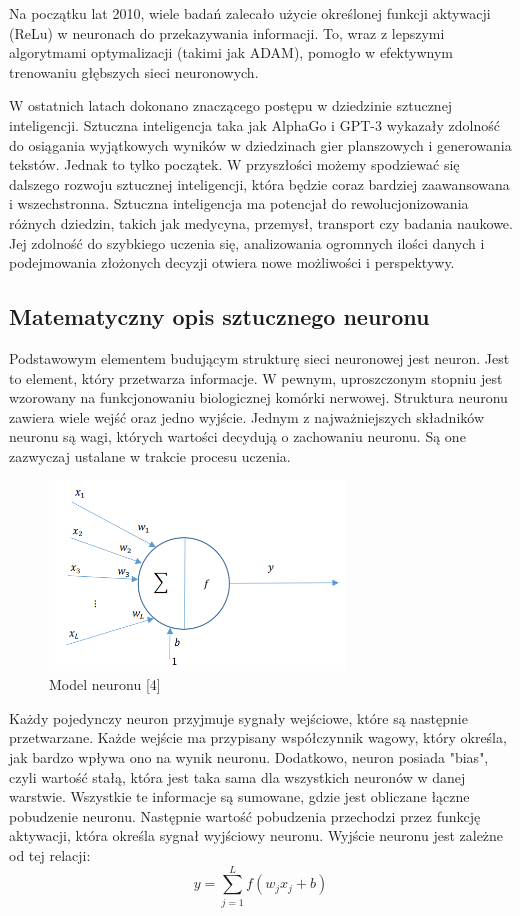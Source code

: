 \documentclass{article}
\begin{document}
Na początku lat 2010, wiele badań zalecało użycie określonej funkcji aktywacji (ReLu) w neuronach do przekazywania informacji. To, wraz z lepszymi algorytmami optymalizacji (takimi jak ADAM), pomogło w efektywnym trenowaniu głębszych sieci neuronowych.


W ostatnich latach dokonano znaczącego postępu w dziedzinie sztucznej inteligencji.
Sztuczna inteligencja taka jak AlphaGo i GPT-3 wykazały zdolność do osiągania wyjątkowych wyników w dziedzinach gier planszowych i generowania tekstów. Jednak to tylko początek. W przyszłości możemy spodziewać się dalszego rozwoju sztucznej inteligencji, która będzie coraz bardziej zaawansowana i wszechstronna.
Sztuczna inteligencja ma potencjał do rewolucjonizowania różnych dziedzin, takich jak medycyna, przemysł, transport czy badania naukowe.
Jej zdolność do szybkiego uczenia się, analizowania ogromnych ilości danych i podejmowania złożonych decyzji otwiera nowe możliwości i perspektywy.
\subsection{Matematyczny opis sztucznego neuronu}
Podstawowym elementem budującym strukturę sieci neuronowej jest neuron. Jest to element, który przetwarza informacje.
W pewnym, uproszczonym stopniu jest wzorowany na funkcjonowaniu biologicznej komórki nerwowej.
Struktura neuronu zawiera wiele wejść oraz jedno wyjście.
Jednym z najważniejszych składników neuronu są wagi, których wartości decydują o zachowaniu neuronu. Są one zazwyczaj ustalane w trakcie procesu uczenia.

\begin{figure}[h]
    \centering
    \includegraphics[width=0.7\textwidth]{model_neuronu.png}
    \caption{Model neuronu [4]}
    \label{fig:zdjecie}
\end{figure}
Każdy pojedynczy neuron przyjmuje sygnały wejściowe, które są następnie przetwarzane.
Każde wejście ma przypisany współczynnik wagowy, który określa, jak bardzo wpływa ono na wynik neuronu.
Dodatkowo, neuron posiada "bias", czyli wartość stałą, która jest taka sama dla wszystkich neuronów w danej warstwie.
Wszystkie te informacje są sumowane, gdzie jest obliczane łączne pobudzenie neuronu.
Następnie wartość pobudzenia przechodzi przez funkcję aktywacji, która określa sygnał wyjściowy neuronu.
Wyjście neuronu jest zależne od tej relacji:
\[
    y = \sum_{j=1}^{L} f(w_{j} x_{j} + b)
\]
\end{document}
